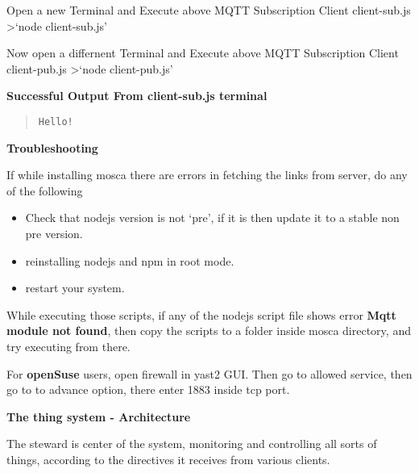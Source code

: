 \documentclass[16pt]{article}
\begin{document}
\begin{enumerate}
Open a new Terminal and Execute above MQTT Subscription Client
client-sub.js \textgreater{}`node client-sub.js'

Now open a differnent Terminal and Execute above MQTT Subscription
Client client-pub.js \textgreater{}`node client-pub.js'

\textbf{Successful Output From client-sub.js terminal}

\begin{quote}
\texttt{Hello!}
\end{quote}

{\Large{\textbf{Troubleshooting}}}


If while installing mosca there are errors in fetching the links from
server, do any of the following 

\begin{itemize}

\item Check that nodejs version is not
`pre', if it is then update it to a stable non pre version.
\item reinstalling nodejs and npm in root mode. 
\item restart your system.

\end{itemize}

While executing those scripts, if any of the nodejs script file shows
error \textbf{Mqtt module not found}, then copy the scripts to a folder
inside mosca directory, and try executing from there.

For \textbf{openSuse} users, open firewall in yast2 GUI. Then go to
allowed service, then go to to advance option, there enter 1883 inside
tcp port.

  
\end{enumerate}



{\Large{\textbf{The thing system - Architecture}}}



The steward is center of the system, monitoring and controlling all
sorts of things, according to the directives it receives from various
clients.
\end{document}

